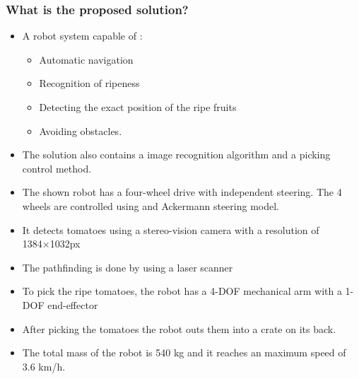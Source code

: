     \subsubsection*{What is the proposed solution?} 
    \begin{itemize}
        \item A robot system capable of : \begin{itemize}
            \item Automatic navigation
            \item Recognition of ripeness
            \item Detecting the exact position of the ripe fruits
            \item Avoiding obstacles.
        \end{itemize}
        \item The solution also contains a image recognition algorithm and a picking control method.
        \item The shown robot has a four-wheel drive with independent steering. The 4 wheels are controlled using and Ackermann steering model.
        \item It detects tomatoes using a stereo-vision camera with a resolution of 1384×1032px
        \item The pathfinding is done by using a laser scanner
        \item To pick the ripe tomatoes, the robot has a 4-DOF mechanical arm with a 1-DOF end-effector 
        \item After picking the tomatoes the robot outs them into a crate on its back.
        \item The total mass of the robot is 540 kg and it reaches an maximum speed of 3.6 km/h.
    \end{itemize}
